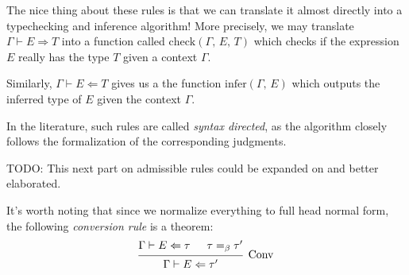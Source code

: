 \documentclass{article}
\begin{document}
\begin{definition} 
\begin{enumerate}


  \end{enumerate}
\end{definition}

The nice thing about these rules is that we can translate it almost directly
into a typechecking and inference algorithm!
More precisely, we may translate $\Gamma \vdash E \Rightarrow T$ into a
function called $\text{check}(\Gamma, \, E, \, T)$ which checks if the
expression $E$ really has the type $T$ given a context $\Gamma$.

Similarly, $\Gamma \vdash E \Leftarrow T$ gives us a the function
$\text{infer}(\Gamma, \, E)$ which outputs the inferred type of $E$ given
the context $\Gamma$.

In the literature, such rules are called \textit{syntax directed}, as the
algorithm closely follows the formalization of the corresponding judgments.

TODO: This next part on admissible rules could be expanded on and better
elaborated.

It's worth noting that since we normalize everything to full head normal form,
the following \textit{conversion rule} is a theorem:
\begin{align*}
  \begin{prooftree}
    \hypo{\Gamma \vdash E \Leftarrow \tau}
    \hypo{\tau =_\beta \tau'}
    \infer2[\text{Conv}]{\Gamma \vdash E \Leftarrow \tau'}
  \end{prooftree}
\end{align*}
\end{document}
